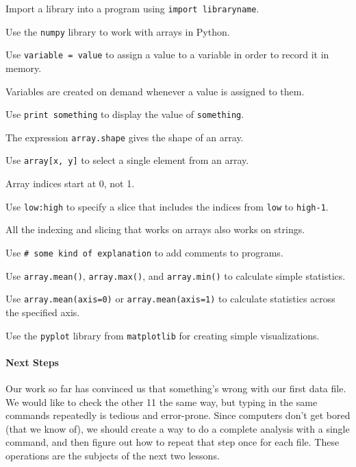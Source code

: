 \documentclass{book}
\begin{document}
\begin{keypoints}
\begin{swcitemize}
\item
  Import a library into a program using \texttt{import libraryname}.
\item
  Use the \texttt{numpy} library to work with arrays in Python.
\item
  Use \texttt{variable = value} to assign a value to a variable in order
  to record it in memory.
\item
  Variables are created on demand whenever a value is assigned to them.
\item
  Use \texttt{print something} to display the value of
  \texttt{something}.
\item
  The expression \texttt{array.shape} gives the shape of an array.
\item
  Use \texttt{array{[}x, y{]}} to select a single element from an array.
\item
  Array indices start at 0, not 1.
\item
  Use \texttt{low:high} to specify a slice that includes the indices
  from \texttt{low} to \texttt{high-1}.
\item
  All the indexing and slicing that works on arrays also works on
  strings.
\item
  Use \texttt{\# some kind of explanation} to add comments to programs.
\item
  Use \texttt{array.mean()}, \texttt{array.max()}, and
  \texttt{array.min()} to calculate simple statistics.
\item
  Use \texttt{array.mean(axis=0)} or \texttt{array.mean(axis=1)} to
  calculate statistics across the specified axis.
\item
  Use the \texttt{pyplot} library from \texttt{matplotlib} for creating
  simple visualizations.
\end{swcitemize}
\end{keypoints}

\mbox{}\paragraph{Next Steps}

Our work so far has convinced us that something's wrong with our first
data file. We would like to check the other 11 the same way, but typing
in the same commands repeatedly is tedious and error-prone. Since
computers don't get bored (that we know of), we should create a way to
do a complete analysis with a single command, and then figure out how to
repeat that step once for each file. These operations are the subjects
of the next two lessons.
\end{document}
